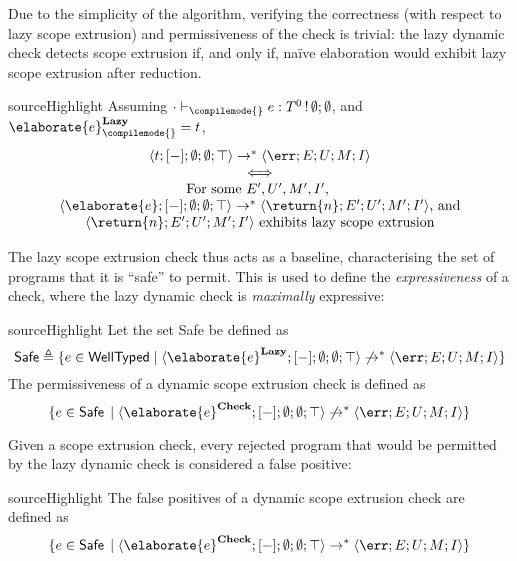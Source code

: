 Due to the simplicity of the algorithm, verifying the correctness (with respect to lazy scope extrusion) and permissiveness of the check is trivial: the lazy dynamic check detects scope extrusion if, and only if, naïve elaboration would exhibit lazy scope extrusion after reduction.

\begin{theorem}{sourceHighlight}
Assuming $\cdot \vdash_{\compilemode{}} e: T^0 \, ! \, \emptyset;\emptyset$, and $\elaborate{e}_{\compilemode{}}^{\textbf{Lazy}} = t$, 
\[\begin{array}{c}
\langle t; [-]; \emptyset; \emptyset; \top \rangle \to^{*} \langle \err; E; U; M; I \rangle \\
\iff \\
\text{For some $E', U', M', I'$, }\\
\langle \elaborate{e}; [-]; \emptyset; \emptyset; \top \rangle \to^{*} \langle \return{n}; E'; U'; M'; I' \rangle\text{, and}\\
\langle \return{n}; E'; U'; M'; I' \rangle \text{ exhibits lazy scope extrusion}
\end{array}
\]
\end{theorem}

The lazy scope extrusion check thus acts as a baseline, characterising the set of \sourceLang{} programs that it is ``safe'' to permit. This is used to define the \textit{expressiveness} of a check, where the lazy dynamic check is \textit{maximally} expressive:

\begin{definition}{sourceHighlight}
Let the set \textsf{Safe} be defined as 
\[\textsf{Safe} \triangleq \{ e \in \textsf{WellTyped} \mid \langle \elaborate{e}^{\textbf{Lazy}}; [-]; \emptyset ; \emptyset ; \top \rangle \not\to^{*} \langle \err ; E ; U ; M ; I \rangle \}\]
The permissiveness of a dynamic scope extrusion check is defined as 
 \[\{ e \in \textsf{Safe}\, \mid \langle \elaborate{e}^{\textbf{Check}};[-];\emptyset;\emptyset;\top \rangle \not\to^{*} \langle \err ; E ; U ; M ; I \rangle \} \]
\end{definition}

Given a scope extrusion check, every rejected program that would be permitted by the lazy dynamic check is considered a false positive:
\begin{definition}{sourceHighlight}
The false positives of a dynamic scope extrusion check are defined as 
 \[\{ e \in \textsf{Safe}\, \mid \langle \elaborate{e}^{\textbf{Check}};[-];\emptyset;\emptyset;\top \rangle \to^{*} \langle \err ; E ; U ; M ; I \rangle \} \]
\end{definition}

